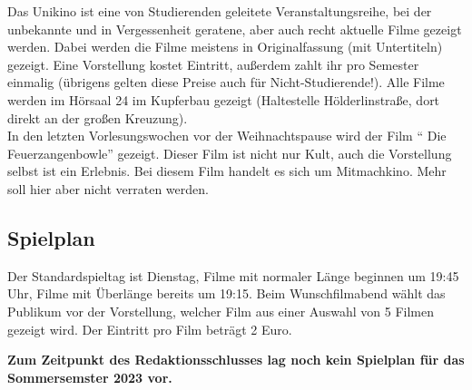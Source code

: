 Das Unikino ist eine von Studierenden geleitete Veranstaltungsreihe, bei der
unbekannte und in Vergessenheit geratene, aber auch recht aktuelle Filme
gezeigt werden. Dabei werden die Filme meistens in Originalfassung (mit
Untertiteln) gezeigt. Eine Vorstellung kostet  Eintritt, außerdem zahlt
ihr pro Semester einmalig  (übrigens gelten diese Preise auch für
Nicht-Studierende!). Alle Filme werden im Hörsaal 24 im Kupferbau gezeigt
(Haltestelle Hölderlinstraße, dort direkt an der großen Kreuzung).\\ 
In den letzten Vorlesungswochen vor der Weihnachtspause wird der Film 
"` Die Feu\-er\-zang\-en\-bow\-le"' gezeigt. Dieser Film ist nicht nur Kult,
auch die Vorstellung selbst ist ein Erlebnis. Bei diesem Film handelt es sich 
um Mitmachkino. Mehr soll hier aber nicht verraten werden.


\vspace*{-1em}

\subsection*{Spielplan}
Der Standardspieltag ist Dienstag, Filme mit normaler Länge beginnen um 19:45
Uhr, Filme mit Überlänge bereits um 19:15. Beim Wunschfilmabend wählt das
Publikum vor der Vorstellung, welcher Film aus einer Auswahl von 5 Filmen
gezeigt wird. Der Eintritt pro Film beträgt 2 Euro. 

\renewcommand{\arraystretch}{1.2}

\textbf{Zum Zeitpunkt des Redaktionsschlusses lag noch kein Spielplan für das
        Sommersemster 2023 vor.}

